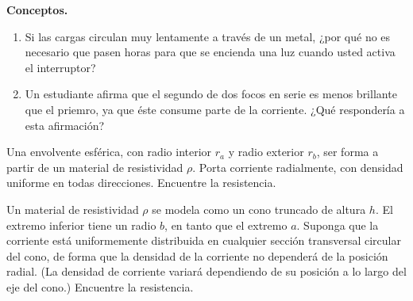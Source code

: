\begin{mdframed}[style=warning]
	\begin{ejercicio}
		\textbf{Conceptos.}
		\begin{enumerate}
			\item Si las cargas circulan muy lentamente a través de un metal, ¿por qué no es necesario que pasen horas para que se encienda una luz cuando usted activa el interruptor?
			\item Un estudiante afirma que el segundo de dos focos en serie es menos brillante que el priemro, ya que éste consume parte de la corriente. ¿Qué respondería a esta afirmación?
		\end{enumerate}
	\end{ejercicio}
\end{mdframed}






\begin{mdframed}[style=warning]
	\begin{ejercicio}
		Una envolvente esférica, con radio interior $r_a$ y radio exterior $r_b$, ser forma a partir de un material de resistividad $\rho$. Porta corriente radialmente, con densidad uniforme en todas direcciones. Encuentre la resistencia.
	\end{ejercicio}
\end{mdframed}





\begin{mdframed}[style=warning]
	\begin{ejercicio}
		Un material de resistividad $\rho$ se modela como un cono truncado de altura $h$. El extremo inferior tiene un radio $b$, en tanto que el extremo $a$. Suponga que la corriente está uniformemente distribuida en cualquier sección transversal circular del cono, de forma que la densidad de la corriente no dependerá de la posición radial. (La densidad de corriente variará dependiendo de su posición a lo largo del eje del cono.) Encuentre la resistencia.
	\end{ejercicio}
\end{mdframed}






